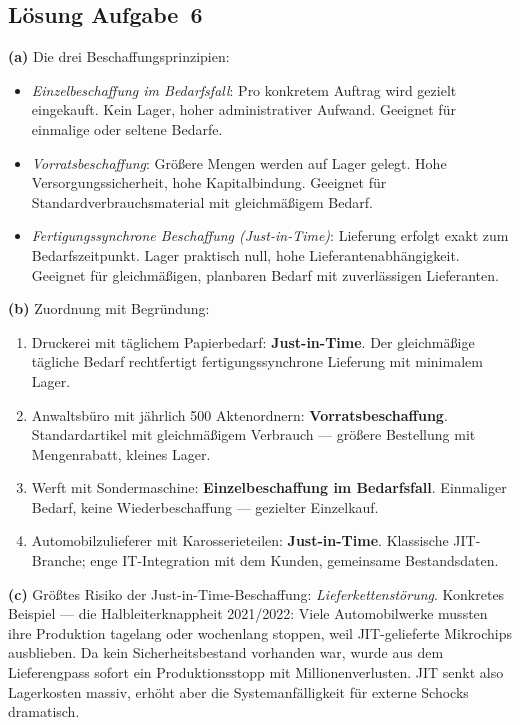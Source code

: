 \documentclass[11pt, a4paper]{article}
\begin{document}
\subsection*{Lösung Aufgabe~6}
\begin{loesung}
\textbf{(a)} Die drei Beschaffungs\-prinzipien:
\begin{itemize}[itemsep=0pt]
  \item \emph{Einzelbeschaffung im Bedarfsfall}: Pro konkretem Auftrag wird gezielt eingekauft. Kein Lager, hoher administrativer Aufwand. Geeignet für einmalige oder seltene Bedarfe.
  \item \emph{Vorratsbeschaffung}: Größere Mengen werden auf Lager gelegt. Hohe Versorgungssicherheit, hohe Kapital\-bindung. Geeignet für Standard\-verbrauchsmaterial mit gleichmäßigem Bedarf.
  \item \emph{Fertigungssynchrone Beschaffung (Just-in-Time)}: Lieferung erfolgt exakt zum Bedarfszeit\-punkt. Lager praktisch null, hohe Liefer\-anten\-abhängigkeit. Geeignet für gleichmäßigen, planbaren Bedarf mit zuverlässigen Lieferanten.
\end{itemize}

\textbf{(b)} Zuordnung mit Begründung:
\begin{enumerate}[label=\arabic*., itemsep=0pt]
  \item Druckerei mit täglichem Papierbedarf: \textbf{Just-in-Time}. Der gleichmäßige tägliche Bedarf rechtfertigt fertigungssynchrone Lieferung mit minimalem Lager.
  \item Anwaltsbüro mit jährlich 500 Aktenordnern: \textbf{Vorratsbeschaffung}. Standardartikel mit gleichmäßigem Verbrauch --- größere Bestellung mit Mengenrabatt, kleines Lager.
  \item Werft mit Sondermaschine: \textbf{Einzelbeschaffung im Bedarfsfall}. Einmaliger Bedarf, keine Wiederbeschaffung --- gezielter Einzelkauf.
  \item Automobil\-zulieferer mit Karosserieteilen: \textbf{Just-in-Time}. Klassische JIT-Branche; enge IT-Integration mit dem Kunden, gemeinsame Bestandsdaten.
\end{enumerate}

\textbf{(c)} Größtes Risiko der Just-in-Time-Beschaffung: \emph{Lieferketten\-störung}.
Konkretes Beispiel --- die Halbleiter\-knappheit 2021/2022: Viele Automobil\-werke mussten
ihre Produktion tagelang oder wochenlang stoppen, weil JIT-gelieferte Mikro\-chips
ausblieben. Da kein Sicherheits\-bestand vorhanden war, wurde aus dem Liefer\-engpass
sofort ein Produktions\-stopp mit Millionen\-verlusten. JIT senkt also Lagerkosten
massiv, erhöht aber die System\-anfälligkeit für externe Schocks dramatisch.
\end{loesung}
\end{document}
